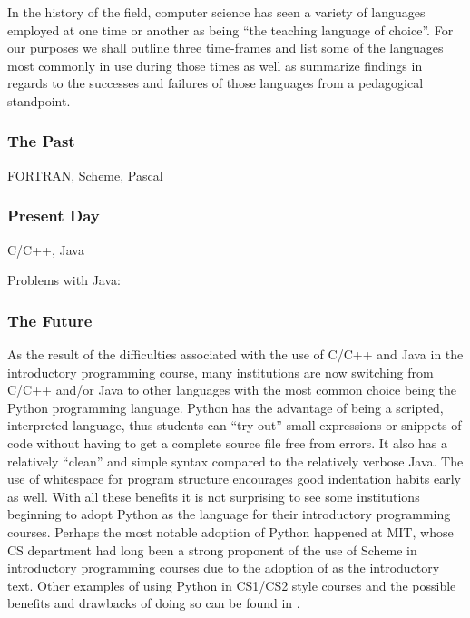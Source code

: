In the history of the field, computer science has seen a variety of languages employed at one time or another as being ``the teaching language of choice''.  For our purposes we shall outline three time-frames and list some of the languages most commonly in use during those times as well as summarize findings in regards to the successes and failures of those languages from a pedagogical standpoint.

\subsubsection{The Past}

FORTRAN, Scheme, Pascal

\subsubsection{Present Day}

C/C++, Java

Problems with Java: \cite{Bos98,Benander04}

\subsubsection{The Future}

As the result of the difficulties associated with the use of C/C++ and Java in the introductory programming course, many institutions are now switching from C/C++ and/or Java to other languages with the most common choice being the Python programming language\cite{python}.  Python has the advantage of being a scripted, interpreted language, thus students can ``try-out'' small expressions or snippets of code without having to get a complete source file free from errors.  It also has a relatively ``clean'' and simple syntax compared to the relatively verbose Java.  The use of whitespace for program structure encourages good indentation habits early as well.  With all these benefits it is not surprising to see some institutions beginning to adopt Python as the language for their introductory programming courses.  Perhaps the most notable adoption of Python happened at MIT, whose CS department had long been a strong proponent of the use of Scheme in introductory programming courses due to the adoption of \cite{SICPbook} as the introductory text\cite{Thetech06}.  Other examples of using Python in CS1/CS2 style courses and the possible benefits and drawbacks of doing so can be found in \cite{Radenski06,Shannon03,Agarwal05,Agarwal08}.

